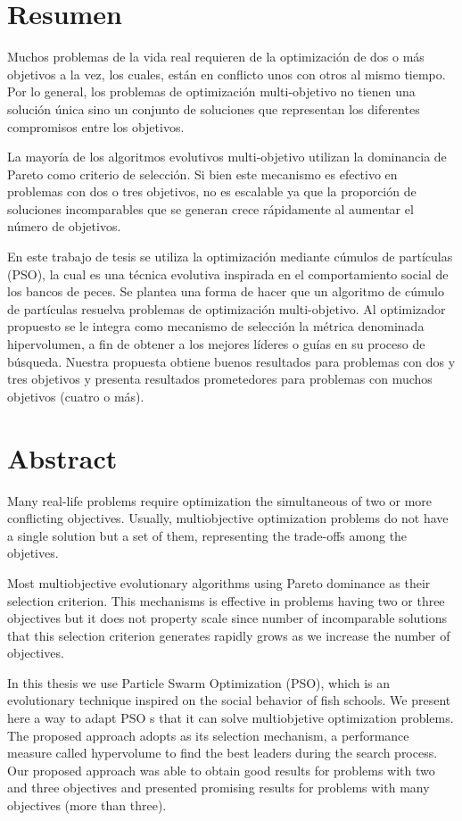 \chapter*{Resumen}

  Muchos problemas de la vida real requieren de la optimizaci\'on de dos o m\'as objetivos a la vez, los cuales, 
  est\'an en conflicto unos con otros al mismo tiempo. Por lo general, los problemas de optimizaci\'on multi-objetivo
  no tienen una soluci\'on \'unica sino un conjunto de soluciones que representan los diferentes compromisos entre 
  los objetivos. 
  
  La mayor\'ia de los algoritmos evolutivos multi-objetivo utilizan la dominancia de Pareto como criterio de
  selecci\'on. Si bien este mecanismo es efectivo en problemas con dos o tres objetivos, no es escalable ya 
  que la proporci\'on de soluciones incomparables que se generan crece r\'apidamente al aumentar el n\'umero de objetivos.
  
  En este trabajo de tesis se utiliza la optimizaci\'on mediante c\'umulos de part\'iculas 
  (PSO), la cual es una t\'ecnica evolutiva inspirada en el comportamiento social de los bancos de peces. Se plantea 
  una forma de hacer que un algoritmo de c\'umulo de part\'iculas resuelva problemas de optimizaci\'on multi-objetivo.
  Al optimizador propuesto se le integra como mecanismo de selecci\'on la m\'etrica denominada hipervolumen, 
  a fin de obtener a los mejores l\'ideres o gu\'ias en su proceso de b\'usqueda. Nuestra propuesta obtiene buenos resultados 
  para problemas con dos y tres objetivos y presenta resultados prometedores para problemas con muchos objetivos (cuatro o 
  m\'as).


\chapter*{Abstract}

  Many real-life problems require optimization the simultaneous of two or more conflicting objectives. 
  Usually, multiobjective optimization problems do not have a single solution but a set of them,
  representing the trade-offs among the objetives.
  
  Most multiobjective evolutionary algorithms using Pareto dominance as their selection criterion. This 
  mechanisms is effective in problems having two or three objectives but it does not property scale since 
  number of incomparable solutions that this selection criterion generates rapidly grows as we increase the
  number of objectives.

  In this thesis we use Particle Swarm Optimization (PSO), which is an evolutionary technique inspired on the social 
  behavior of fish schools. We present here a way to adapt PSO s that it can solve multiobjetive optimization problems.
  The proposed approach adopts as its selection mechanism, a performance measure called hypervolume to find the best leaders
  during the search process. Our proposed approach was able to obtain good results for problems with two and three 
  objectives and presented promising results for problems with many objectives (more than three).